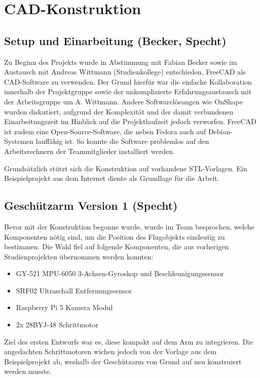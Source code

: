 \chapter{CAD-Konstruktion}

\section{Setup und Einarbeitung (Becker, Specht)}

Zu Beginn des Projekts wurde in Abstimmung mit Fabian Becker sowie im Austausch mit Andreas Wittmann (Studienkollege) entschieden, FreeCAD als CAD-Software zu verwenden. Der Grund hierfür war die einfache Kollaboration innerhalb der Projektgruppe sowie der unkomplizierte Erfahrungsaustausch mit der Arbeitsgruppe um A. Wittmann. Andere Softwarelösungen wie OnShape wurden diskutiert, aufgrund der Komplexität und der damit verbundenen Einarbeitungszeit im Hinblick auf die Projektlaufzeit jedoch verworfen. FreeCAD ist zudem eine Open-Source-Software, die neben Fedora auch auf Debian-Systemen lauffähig ist. So konnte die Software problemlos auf den Arbeitsrechnern der Teammitglieder installiert werden.

Grundsätzlich stützt sich die Konstruktion auf vorhandene STL-Vorlagen. Ein Beispielprojekt aus dem Internet diente als Grundlage für die Arbeit.

\section{Geschützarm Version 1 (Specht) \label{sec:cad_gunarm_v1}}

Bevor mit der Konstruktion begonne wurde, wurde im Team besprochen, welche Komponenten nötig sind, um die Position des Flugobjekts eindeutig zu bestimmen. Die Wahl fiel auf folgende Komponenten, die aus vorherigen Studienprojekten übernommen werden konnten:

\begin{itemize}
    \item GY-521 MPU-6050 3-Achsen-Gyroskop und Beschleunigungssensor
    \item SRF02 Ultraschall Entfernungssensor
    \item Raspberry Pi 5 Kamera Modul
    \item 2x 28BYJ-48 Schrittmotor
\end{itemize}

Ziel des ersten Entwurfs war es, diese kompakt auf dem Arm zu integrieren. Die angedachten Schrittmotoren wichen jedoch von der Vorlage aus dem Beispielprojekt ab, weshalb der Geschützarm von Grund auf neu konstruiert werden musste.

